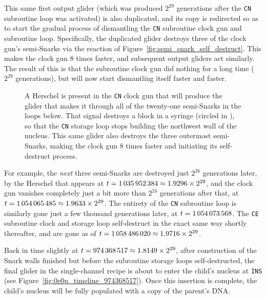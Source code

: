 This same first output glider (which was produced $2^{29}$ generations after the \texttt{CN} subroutine loop was activated) is also duplicated, and its copy is redirected so as to start the gradual process of dismantling the \texttt{CN} subroutine clock gun and subroutine loop. Specifically, the duplicated glider destroys three of the clock gun's semi-Snarks via the reaction of Figure~\ref{fig:semi_snark_self_destruct}. This makes the clock gun 8 times faster, and subsequent output gliders act similarly. The result of this is that the subroutine clock gun did nothing for a long time ($2^{29}$ generations), but will now start dismantling itself faster and faster. 

\begin{figure}[!htb]
	\centering
	\caption{A Herschel is present in the \texttt{CN} clock gun that will produce the glider that makes it through all of the twenty-one semi-Snarks in the loops below. That signal destroys a block in a syringe (circled in ), so that the \texttt{CN} storage loop stops building the northwest wall of the nucleus. This same glider also destroys the three outermost semi-Snarks, making the clock gun $8$ times faster and initiating its self-destruct process.}
	\label{fig:0e0p_timeline_968843520}
\end{figure}

For example, the \emph{next} three semi-Snarks are destroyed just $2^{26}$ generations later, by the Herschel that appears at $t = 1{\,}035{\,}952{\,}384 \approx 1.9296 \times 2^{29}$, and the clock gun vanishes completely just a bit more than $2^{24}$ generations after that, at $t = 1{\,}054{\,}065{\,}485 \approx 1.9633 \times 2^{29}$. The entirety of the \texttt{CN} subroutine loop is similarly gone just a few thousand generations later, at $t = 1{\,}054{\,}073{\,}568$. The \texttt{CE} subroutine clock and storage loop self-destruct in the exact same way shortly thereafter, and are gone as of $t = 1{\,}058{\,}486{\,}020 \approx 1.9716 \times 2^{29}$.

Back in time slightly at $t = 974{\,}368{\,}517 \approx 1.8149 \times 2^{29}$, after construction of the Snark walls finished but before the subroutine storage loops self-destructed, the final glider in the single-channel recipe is about to enter the child's nucleus at \texttt{INS} (see Figure~\ref{fig:0e0p_timeline_974368517}). Once this insertion is complete, the child's nucleus will be fully populated with a copy of the parent's DNA.

